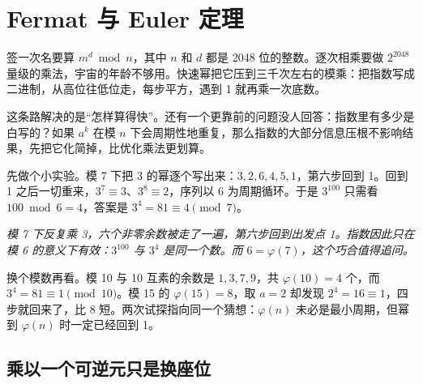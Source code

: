 \section{Fermat 与 Euler 定理}
\label{sec:04-Discrete-Mathematics/04-Number-Theory/03}

签一次名要算 \(m^{d}\bmod n\)，其中 \(n\) 和 \(d\) 都是 2048 位的整数。逐次相乘要做 \(2^{2048}\) 量级的乘法，宇宙的年龄不够用。快速幂把它压到三千次左右的模乘：把指数写成二进制，从高位往低位走，每步平方，遇到 1 就再乘一次底数。

这条路解决的是``怎样算得快''。还有一个更靠前的问题没人回答：指数里有多少是白写的？如果 \(a^{k}\) 在模 \(n\) 下会周期性地重复，那么指数的大部分信息压根不影响结果，先把它化简掉，比优化乘法更划算。

先做个小实验。模 7 下把 3 的幂逐个写出来：\(3,2,6,4,5,1\)，第六步回到 1。回到 1 之后一切重来，\(3^{7}\equiv3\)、\(3^{8}\equiv2\)，序列以 6 为周期循环。于是 \(3^{100}\) 只需看 \(100\bmod 6=4\)，答案是 \(3^{4}=81\equiv4\pmod 7\)。

\begin{center}

\emph{模 7 下反复乘 3，六个非零余数被走了一遍，第六步回到出发点 1。指数因此只在模 6 的意义下有效：\(3^{100}\) 与 \(3^{4}\) 是同一个数。而 \(6=\varphi(7)\)，这个巧合值得追问。}
\end{center}

换个模数再看。模 10 与 10 互素的余数是 \(1,3,7,9\)，共 \(\varphi(10)=4\) 个，而 \(3^{4}=81\equiv1\pmod{10}\)。模 15 的 \(\varphi(15)=8\)，取 \(a=2\) 却发现 \(2^{4}=16\equiv1\)，四步就回来了，比 8 短。两次试探指向同一个猜想：\(\varphi(n)\) 未必是最小周期，但幂到 \(\varphi(n)\) 时一定已经回到 1。

\subsection{乘以一个可逆元只是换座位}

